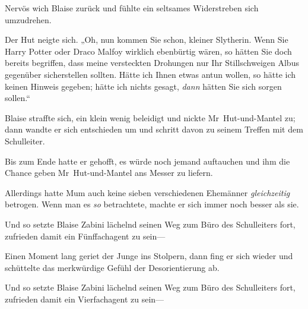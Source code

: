 Nervös wich Blaise zurück und fühlte ein seltsames Widerstreben sich umzudrehen.

Der Hut neigte sich. „Oh, nun kommen Sie schon, kleiner Slytherin. Wenn Sie Harry Potter oder Draco Malfoy wirklich ebenbürtig wären, so hätten Sie doch bereits begriffen, dass meine versteckten Drohungen nur Ihr Stillschweigen Albus gegenüber sicherstellen sollten. Hätte ich Ihnen etwas antun wollen, so hätte ich keinen Hinweis gegeben; hätte ich nichts gesagt, \emph{dann} hätten Sie sich sorgen sollen.“

Blaise straffte sich, ein klein wenig beleidigt und nickte Mr~Hut-und-Mantel zu; dann wandte er sich entschieden um und schritt davon zu seinem Treffen mit dem Schulleiter.

Bis zum Ende hatte er gehofft, es würde noch jemand auftauchen und ihm die Chance geben Mr~Hut-und-Mantel ans Messer zu liefern.

Allerdings hatte Mum auch keine sieben verschiedenen Ehemänner \emph{gleichzeitig} betrogen. Wenn man es \emph{so} betrachtete, machte er sich immer noch besser als sie.

Und so setzte Blaise Zabini lächelnd seinen Weg zum Büro des Schulleiters fort, zufrieden damit ein Fünffachagent zu sein—

Einen Moment lang geriet der Junge ins Stolpern, dann fing er sich wieder und schüttelte das merkwürdige Gefühl der Desorientierung ab.

Und so setzte Blaise Zabini lächelnd seinen Weg zum Büro des Schulleiters fort, zufrieden damit ein Vierfachagent zu sein—

